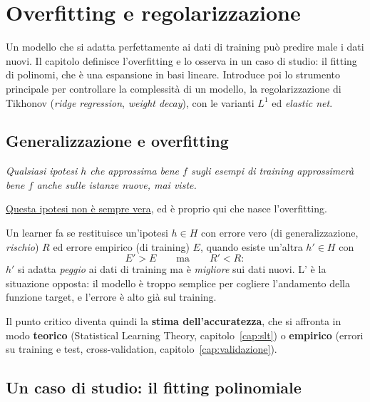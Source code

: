 \chapter{Overfitting e regolarizzazione}
\label{cap:regolarizzazione}

\begin{inbreve}
Un modello che si adatta perfettamente ai dati di training può predire male i dati nuovi. Il capitolo definisce
l'overfitting e lo osserva in un caso di studio: il fitting di polinomi, che è una espansione in basi lineare.
Introduce poi lo strumento principale per controllare la complessità di un modello, la regolarizzazione di
Tikhonov (\emph{ridge regression}, \emph{weight decay}), con le varianti $L^1$ ed \emph{elastic net}.
\end{inbreve}

\section{Generalizzazione e overfitting}
\label{sec:overfitting}

\begin{definizione}
\emph{Qualsiasi ipotesi $h$ che approssima bene $f$ sugli esempi di training approssimerà bene $f$ anche sulle
istanze nuove, mai viste.}
\end{definizione}

\uline{Questa ipotesi non è sempre vera}, ed è proprio qui che nasce l'overfitting.

\begin{definizione}[Overfitting]
Un learner fa  se restituisce un'ipotesi $h\in H$ con errore vero (di generalizzazione,
\emph{rischio}) $R$ ed errore empirico (di training) $E$, quando esiste un'altra $h'\in H$ con
\[
E' > E \qquad\text{ma}\qquad R' < R :
\]
$h'$ si adatta \emph{peggio} ai dati di training ma è \emph{migliore} sui dati nuovi. L' è
la situazione opposta: il modello è troppo semplice per cogliere l'andamento della funzione target, e
l'errore è alto già sul training.
\end{definizione}

Il punto critico diventa quindi la \textbf{stima dell'accuratezza}, che si affronta in modo \textbf{teorico}
(Statistical Learning Theory, capitolo~\ref{cap:slt}) o \textbf{empirico} (errori su training e test,
cross-validation, capitolo~\ref{cap:validazione}).

\section{Un caso di studio: il fitting polinomiale}
\label{sec:polinomi}

